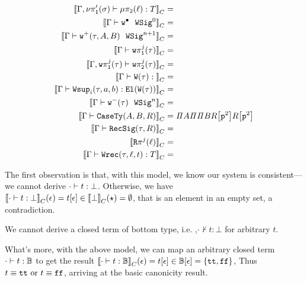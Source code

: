 \begin{align*}
  \denotesC{\goodTerm{\Gm, \lsigprojT{\lsig}}{\lkgproj{2}{\ell}}{T}} &= \\
  \denotesC{\goodWSig{\Gm}{\WSigEmp}{0}} &= \\
  \denotesC{\goodWSig{\Gm}{\WSigAdd{\wsig}{A}{B}}{n+1}} &= \\
  \denotesC{\goodType{\Gm}{\wsigproj{j}{1}{\wsig}}{}} &= \\
  \denotesC{\goodType{\Gm, \wsigproj{j}{1}{\wsig}}{\wsigproj{j}{2}{\wsig}}{}} &= \\
  \denotesC{\goodTerm{\Gm}{\wcode{\wsig}}{}} &= \\
  \denotesC{\goodTerm{\Gm}{\Wsup{i}{\wsig}{a}{b}}{\El{\wcode{\wsig}}}} &= \\
  \denotesC{\goodWSig{\Gm}{\WSigSub{\wsig}}{n}} &= \\
  \denotesC{\goodType{\Gm}{\CaseSig{A}{B}{R}}{}} &= {\mathit{\Pi}{A}{\mathit{\Pi} {\mathit{\Pi}{B}{\sub{R}{\SubstWeak{2}}}} {\sub{R}{\SubstWeak{2}}}}}\\
  \denotesC{\goodType{\Gm}{\RecSig{\wsig}{R}}{}} &= \\
  \denotesC{\Recproj{j}{\lkg}} &= \\
  \denotesC{\goodTerm{\Gm}{\Wrec{\wsig}{\lkg}{t}}{T}} &= \\
\end{align*}


The first observation is that, with this model, we know our system is consistent---we cannot derive $\goodTerm{\cdot}{t}{\bot}$. Otherwise, we have $\denotesC{\goodTerm{\cdot}{t}{\bot}}(\SubstEmp) = \sub{t}{\SubstEmp} \in \denotesC{\bot}(\star) = \emptyset$, that is an element in an empty set, a contradiction.

\begin{theorem}[Consistency]
  We cannot derive a closed term of bottom type, i.e. ,$\cdot \not \vdash t : \bot$ for arbitrary $t$.
\end{theorem}

What's more, with the above model, we can map an arbitrary closed term $\goodTerm{\cdot}{t}{\cB}$ to get the result $\denotesC{\goodTerm{\cdot}{t}{\cB}}(\SubstEmp) = \sub{t}{\SubstEmp} \in \sub{\cB}{\SubstEmp} = \{\true, \false\}$, Thus $t \equiv \true \text{ or } t \equiv\false$, arriving at the basic canonicity result.


